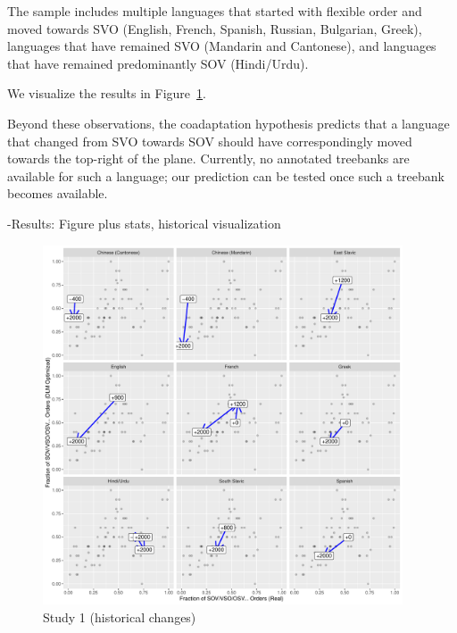 \documentclass[11pt,a4paper]{article}
\begin{document}
The sample includes multiple languages that started with flexible order and moved towards SVO (English, French, Spanish, Russian, Bulgarian, Greek), languages that have remained SVO (Mandarin and Cantonese), and languages that have remained predominantly SOV (Hindi/Urdu).

We visualize the results in Figure~\ref{fig:historical}.



Beyond these observations, the coadaptation hypothesis predicts that a language that changed from SVO towards SOV should have correspondingly moved towards the top-right of the plane. 
Currently, no annotated treebanks are available for such a language; our prediction can be tested once such a treebank becomes available.


-Results: Figure  plus stats, historical visualization





\begin{figure}
    \centering
    \includegraphics[width=0.95\textwidth]{figures/historical_2.6_times.pdf}
    \caption{Study 1 (historical changes)}
    \label{fig:historical}
\end{figure}
\end{document}
